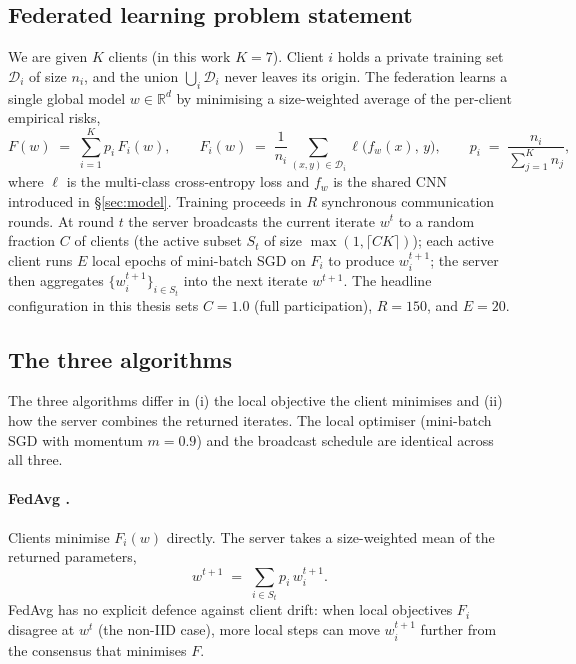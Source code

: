 \documentclass[11pt,a4paper]{article}
\begin{document}
\subsection{Federated learning problem statement}
We are given $K$ clients (in this work $K=7$). Client $i$ holds a private
training set $\mathcal{D}_i$ of size $n_i$, and the union
$\bigcup_i \mathcal{D}_i$ never leaves its origin. The federation learns a
single global model $w \in \mathbb{R}^d$ by minimising a size-weighted average
of the per-client empirical risks,
\begin{equation}
F(w) \;=\; \sum_{i=1}^{K} p_i\, F_i(w),
\qquad
F_i(w) \;=\; \frac{1}{n_i}\!\!\sum_{(x,y)\in\mathcal{D}_i}\!\! \ell\bigl(f_w(x),\, y\bigr),
\qquad
p_i \;=\; \frac{n_i}{\sum_{j=1}^{K} n_j},
\label{eq:fl-objective}
\end{equation}
where $\ell$ is the multi-class cross-entropy loss and $f_w$ is the shared CNN
introduced in \S\ref{sec:model}. Training proceeds in $R$ synchronous
communication rounds. At round $t$ the server broadcasts the current iterate
$w^t$ to a random fraction $C$ of clients (the active subset $S_t$ of size
$\max(1,\lceil C K\rceil)$); each active client runs $E$ local epochs of
mini-batch SGD on $F_i$ to produce $w_i^{t+1}$; the server then aggregates
$\{w_i^{t+1}\}_{i\in S_t}$ into the next iterate $w^{t+1}$. The headline
configuration in this thesis sets $C=1.0$ (full participation), $R=150$, and
$E=20$.

\subsection{The three algorithms}
The three algorithms differ in (i) the local objective the client minimises
and (ii) how the server combines the returned iterates. The local optimiser
(mini-batch SGD with momentum $m=0.9$) and the broadcast schedule are
identical across all three.

\paragraph{FedAvg \citep{mcmahan2017fedavg}.}
Clients minimise $F_i(w)$ directly. The server takes a size-weighted mean of
the returned parameters,
\begin{equation}
w^{t+1} \;=\; \sum_{i\in S_t} p_i\, w_i^{t+1}.
\label{eq:fedavg}
\end{equation}
FedAvg has no explicit defence against client drift: when local objectives
$F_i$ disagree at $w^t$ (the non-IID case), more local steps can move
$w_i^{t+1}$ further from the consensus that minimises $F$.
\end{document}
